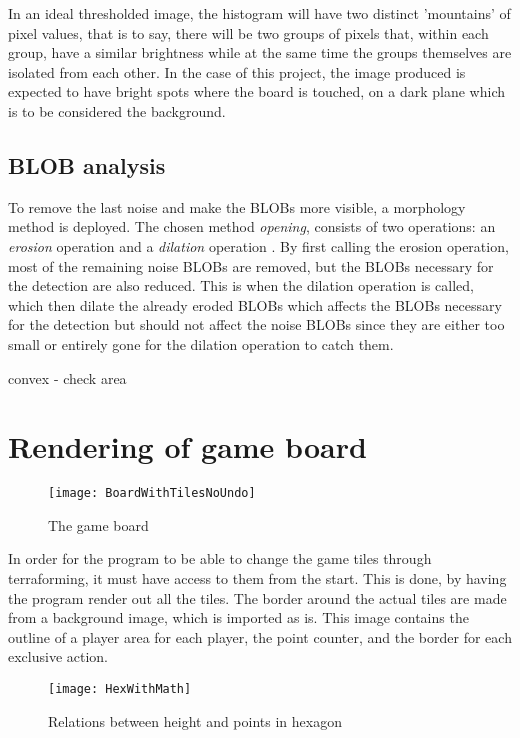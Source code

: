 In an ideal thresholded image, the histogram will have two distinct 'mountains' of pixel values, that is to say, there will be two groups of pixels that, within each group, have a similar brightness while at the same time the groups themselves are isolated from each other. In the case of this project, the image produced is expected to have bright spots where the board is touched, on a dark plane which is to be considered the background.
 
 
\subsection{BLOB analysis}

To remove the last noise and make the BLOBs more visible, a morphology method is deployed. The chosen method \textit{opening}, consists of two operations: an \textit{erosion} operation and a \textit{dilation} operation \citep{moeslund_introduction_2012}. By first calling the erosion operation, most of the remaining noise BLOBs are removed, but the BLOBs necessary for the detection are also reduced. This is when the dilation operation is called, which then dilate the already eroded BLOBs which affects the BLOBs necessary for the detection but should not affect the noise BLOBs since they are either too small or entirely gone for the dilation operation to catch them. 


convex - check area

\section{Rendering of game board}
\begin{figure}[h!]
\centering \texttt{[image: BoardWithTilesNoUndo]}
\caption{The game board \label{Fig:Board}}
\end{figure}
In order for the program to be able to change the game tiles through terraforming, it must have access to them from the start. This is done, by having the program render out all the tiles. The border around the actual tiles are made from a background image, which is imported as is. This image contains the outline of a player area for each player, the point counter, and the border for each exclusive action. 
\begin{figure}[h!]
\centering \texttt{[image: HexWithMath]}
\caption{Relations between height and points in hexagon \label{Fig:HexWithMath}}
\end{figure}

